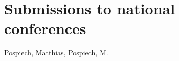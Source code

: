 \section*{Submissions to national conferences}
\begin{refsection}
\nocite{EmonsDPG2009, HoffmannDPG2008, LangDPG2008, VaeckenstedtDPG2010, PospiechDPG2009, PospiechDPG2010, PospiechDPG2011}
\forcsvlist{\listadd\bibboldnames}
  {{Pospiech, Matthias}, {Pospiech, M.}}
\begin{refcontext}[sorting=nyt]  
	\printbibliography[env=numbered+bold, heading=none, resetnumbers=true]
\end{refcontext}
\end{refsection}
%
\renewcommand*{\bibboldnames}{}
